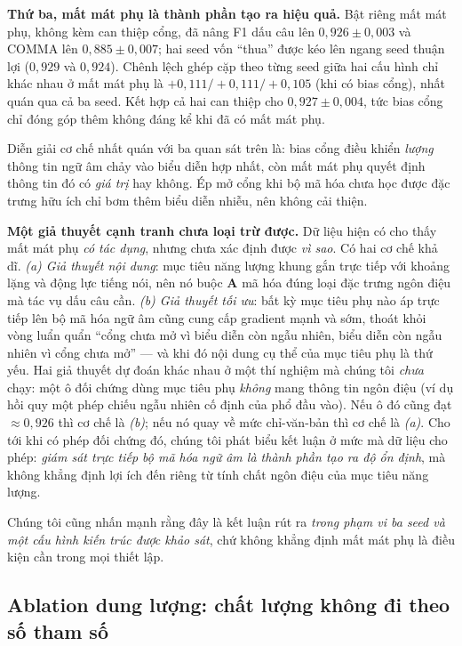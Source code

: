 \documentclass[conference,onecolumn]{IEEEtran}
\begin{document}
\textbf{Thứ ba, mất mát phụ là thành phần tạo ra hiệu quả.} Bật riêng mất mát phụ,
không kèm can thiệp cổng, đã nâng F1 dấu câu lên $0{,}926\pm0{,}003$ và COMMA lên
$0{,}885\pm0{,}007$; hai seed vốn ``thua'' được kéo lên ngang seed thuận lợi
($0{,}929$ và $0{,}924$). Chênh lệch ghép cặp theo từng seed giữa hai cấu hình chỉ
khác nhau ở mất mát phụ là $+0{,}111/+0{,}111/+0{,}105$ (khi có bias cổng), nhất
quán qua cả ba seed. Kết hợp cả hai can thiệp cho $0{,}927\pm0{,}004$, tức bias cổng
chỉ đóng góp thêm không đáng kể khi đã có mất mát phụ.

Diễn giải cơ chế nhất quán với ba quan sát trên là: bias cổng điều khiển
\emph{lượng} thông tin ngữ âm chảy vào biểu diễn hợp nhất, còn mất mát phụ quyết
định thông tin đó có \emph{giá trị} hay không. Ép mở cổng khi bộ mã hóa chưa học
được đặc trưng hữu ích chỉ bơm thêm biểu diễn nhiễu, nên không cải thiện.

\textbf{Một giả thuyết cạnh tranh chưa loại trừ được.} Dữ liệu hiện có cho thấy
mất mát phụ \emph{có tác dụng}, nhưng chưa xác định được \emph{vì sao}. Có hai
cơ chế khả dĩ. \emph{(a) Giả thuyết nội dung}: mục tiêu năng lượng khung gắn
trực tiếp với khoảng lặng và động lực tiếng nói, nên nó buộc $\mathbf{A}$ mã hóa
đúng loại đặc trưng ngôn điệu mà tác vụ dấu câu cần. \emph{(b) Giả thuyết tối
ưu}: bất kỳ mục tiêu phụ nào áp trực tiếp lên bộ mã hóa ngữ âm cũng cung cấp
gradient mạnh và sớm, thoát khỏi vòng luẩn quẩn ``cổng chưa mở vì biểu diễn còn
ngẫu nhiên, biểu diễn còn ngẫu nhiên vì cổng chưa mở'' --- và khi đó nội dung cụ
thể của mục tiêu phụ là thứ yếu. Hai giả thuyết dự đoán khác nhau ở một thí
nghiệm mà chúng tôi \emph{chưa} chạy: một ô đối chứng dùng mục tiêu phụ
\emph{không} mang thông tin ngôn điệu (ví dụ hồi quy một phép chiếu ngẫu nhiên
cố định của phổ đầu vào). Nếu ô đó cũng đạt $\approx\!0{,}926$ thì cơ chế là
\emph{(b)}; nếu nó quay về mức chỉ-văn-bản thì cơ chế là \emph{(a)}. Cho tới khi
có phép đối chứng đó, chúng tôi phát biểu kết luận ở mức mà dữ liệu cho phép:
\emph{giám sát trực tiếp bộ mã hóa ngữ âm là thành phần tạo ra độ ổn định}, mà
không khẳng định lợi ích đến riêng từ tính chất ngôn điệu của mục tiêu năng lượng.

Chúng tôi cũng nhấn mạnh rằng đây là kết luận rút ra \emph{trong phạm vi ba seed
và một cấu hình kiến trúc được khảo sát}, chứ không khẳng định mất mát phụ là
điều kiện cần trong mọi thiết lập.

\subsection{Ablation dung lượng: chất lượng không đi theo số tham số}
\label{sec:capacity}
\end{document}
